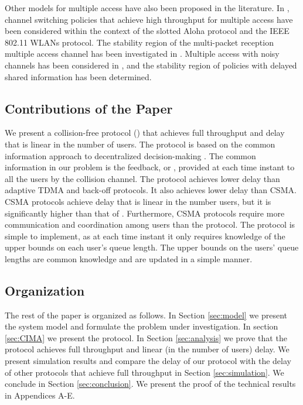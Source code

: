 \documentclass[onecolumn,draftcls]{IEEEtran}
\begin{document}
Other models for multiple access have also been proposed in the literature.
In \cite{wang2014optimal}, channel switching policies that achieve high throughput for multiple access have been considered within the context of the slotted Aloha protocol and the IEEE 802.11 WLANs protocol.
The stability region of the multi-packet reception multiple access channel has been investigated in \cite{luo2006throughput}.
Multiple access with noisy channels has been considered in \cite{ying2011throughput, reddy2012distributed}, and the stability region of policies with delayed shared information has been determined.







\subsection*{Contributions of the Paper}
We present a collision-free protocol () that achieves full throughput and delay that is linear in the number of users.
The protocol is based on the common information approach to decentralized decision-making \cite{nayyar2013decentralized}.
The common information in our problem is the feedback,  or , provided at each time instant to all the users by the collision channel. The protocol achieves lower delay than adaptive TDMA and back-off protocols. It also achieves lower delay than CSMA. CSMA protocols achieve delay that is linear in the number users, but it is significantly higher than that of . Furthermore, CSMA protocols require more communication and coordination among users than the  protocol.
The  protocol is simple to implement, as at each time instant it only requires knowledge of the upper bounds on each user's queue length. The upper bounds on the users' queue lengths are common knowledge and are updated in a simple manner.


\subsection*{Organization}
The rest of the paper is organized as follows. In Section \ref{sec:model} we present the system model and formulate the problem under investigation. In section \ref{sec:CIMA} we present the  protocol.
In Section \ref{sec:analysis} we prove that the  protocol achieves full throughput and linear (in the number of users) delay.
We present simulation results and compare the delay of our protocol with the delay of other 
protocols that achieve full throughput in Section \ref{sec:simulation}.
We conclude in Section \ref{sec:conclusion}.
We present the proof of the technical results in Appendices A-E.
\end{document}
